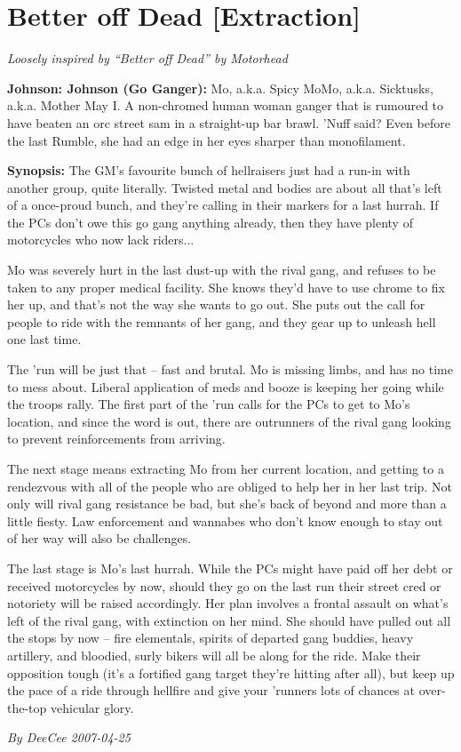 \documentclass[letterpaper,twocolumn,10.5pt]{article}
\newenvironment{scenario}[6]
	{
		\section{#1 {\small[#2]}}
		\textit{#3}
		\def\TMPSCENARIO{#4 #5}
	}
	{\small\textit{By \TMPSCENARIO}}
\newcommand{\johnson}[2]{\textbf{Johnson: #1 (#2):}}
\newcommand{\synopsis}{\textbf{Synopsis: }}
\begin{document}
\begin{scenario}{Better off Dead}
	{Extraction}
	{ Loosely inspired by ``Better off Dead'' by Motorhead}
	{DeeCee}
	{2007-04-25}
	{https://forum.rpg.net/showthread.php?321504-Shadowrun-4th-101-Instant-Scenarios\&p=7219106#post7219106}

\johnson{Johnson}{Go Ganger} Mo, a.k.a. Spicy MoMo, a.k.a. Sicktusks, a.k.a. Mother May I. A non-chromed human woman ganger that is rumoured to have beaten an orc street sam in a straight-up bar brawl. 'Nuff said? Even before the last Rumble, she had an edge in her eyes sharper than monofilament.

\synopsis The GM's favourite bunch of hellraisers just had a run-in with another group, quite literally. Twisted metal and bodies are about all that's left of a once-proud bunch, and they're calling in their markers for a last hurrah. If the PCs don't owe this go gang anything already, then they have plenty of motorcycles who now lack riders...

Mo was severely hurt in the last dust-up with the rival gang, and refuses to be taken to any proper medical facility. She knows they'd have to use chrome to fix her up, and that's not the way she wants to go out. She puts out the call for people to ride with the remnants of her gang, and they gear up to unleash hell one last time.

The 'run will be just that – fast and brutal. Mo is missing limbs, and has no time to mess about. Liberal application of meds and booze is keeping her going while the troops rally. The first part of the 'run calls for the PCs to get to Mo's location, and since the word is out, there are outrunners of the rival gang looking to prevent reinforcements from arriving.

The next stage means extracting Mo from her current location, and getting to a rendezvous with all of the people who are obliged to help her in her last trip. Not only will rival gang resistance be bad, but she's back of beyond and more than a little fiesty. Law enforcement and wannabes who don't know enough to stay out of her way will also be challenges.

The last stage is Mo's last hurrah. While the PCs might have paid off her debt or received motorcycles by now, should they go on the last run their street cred or notoriety will be raised accordingly. Her plan involves a frontal assault on what's left of the rival gang, with extinction on her mind. She should have pulled out all the stops by now – fire elementals, spirits of departed gang buddies, heavy artillery, and bloodied, surly bikers will all be along for the ride. Make their opposition tough (it's a fortified gang target they're hitting after all), but keep up the pace of a ride through hellfire and give your 'runners lots of chances at over-the-top vehicular glory. 

\end{scenario}
\end{document}

